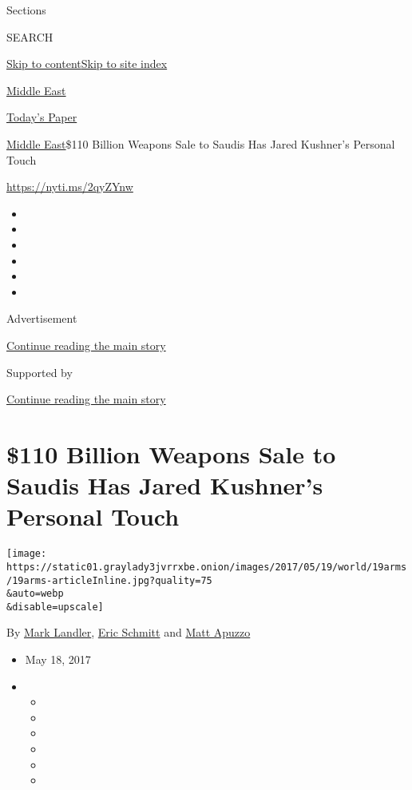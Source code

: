 Sections

SEARCH

\protect\hyperlink{site-content}{Skip to
content}\protect\hyperlink{site-index}{Skip to site index}

\href{https://www.nytimes3xbfgragh.onion/section/world/middleeast}{Middle
East}

\href{https://myaccount.nytimes3xbfgragh.onion/auth/login?response_type=cookie\&client_id=vi}{}

\href{https://www.nytimes3xbfgragh.onion/section/todayspaper}{Today's
Paper}

\href{/section/world/middleeast}{Middle East}\textbar{}\$110 Billion
Weapons Sale to Saudis Has Jared Kushner's Personal Touch

\url{https://nyti.ms/2qyZYnw}

\begin{itemize}
\item
\item
\item
\item
\item
\item
\end{itemize}

Advertisement

\protect\hyperlink{after-top}{Continue reading the main story}

Supported by

\protect\hyperlink{after-sponsor}{Continue reading the main story}

\hypertarget{110-billion-weapons-sale-to-saudis-has-jared-kushners-personal-touch}{%
\section{\$110 Billion Weapons Sale to Saudis Has Jared Kushner's
Personal
Touch}\label{110-billion-weapons-sale-to-saudis-has-jared-kushners-personal-touch}}

\texttt{[image: https://static01.graylady3jvrrxbe.onion/images/2017/05/19/world/19arms/19arms-articleInline.jpg?quality=75\\\&auto=webp\\\&disable=upscale]}

By \href{http://www.nytimes3xbfgragh.onion/by/mark-landler}{Mark
Landler}, \href{http://www.nytimes3xbfgragh.onion/by/eric-schmitt}{Eric
Schmitt} and
\href{http://www.nytimes3xbfgragh.onion/by/matt-apuzzo}{Matt Apuzzo}

\begin{itemize}
\item
  May 18, 2017
\item
  \begin{itemize}
  \item
  \item
  \item
  \item
  \item
  \item
  \end{itemize}
\end{itemize}

